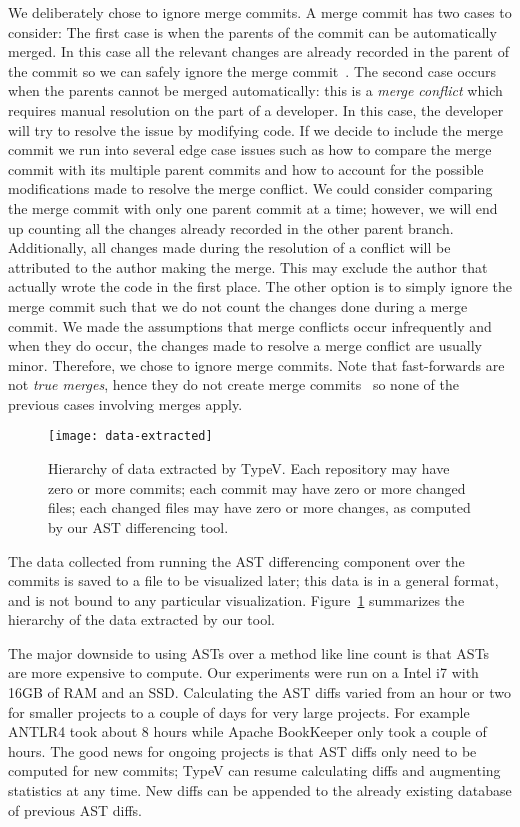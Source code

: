 We deliberately chose to ignore merge commits. A merge commit has two cases to consider: The first case is when the parents of the commit can be automatically merged. In this case all the relevant changes are already recorded in the parent of the commit so we can safely ignore the merge commit~\cite{git:merge}. The second case occurs when the parents cannot be merged automatically: this is a \emph{merge conflict} which requires manual resolution on the part of a developer. In this case, the developer will try to resolve the issue by modifying code. If we decide to include the merge commit we run into several edge case issues such as how to compare the merge commit with its multiple parent commits and how to account for the possible modifications made to resolve the merge conflict. We could consider comparing the merge commit with only one parent commit at a time; however, we will end up counting all the changes already recorded in the other parent branch. Additionally, all changes made during the resolution of a conflict will be attributed to the author making the merge. This may exclude the author that actually wrote the code in the first place. The other option is to simply ignore the merge commit such that we do not count the changes done during a merge commit. We made the assumptions that merge conflicts occur infrequently and when they do occur, the changes made to resolve a merge conflict are usually minor. Therefore, we chose to ignore merge commits. Note that fast-forwards are not \emph{true merges}, hence they do not create merge commits~\cite{git:merge} so none of the previous cases involving merges apply.

\begin{figure}[h]
\centering
\texttt{[image: data-extracted]}
\caption{Hierarchy of data extracted by TypeV. Each repository may have zero or more commits; each commit may have zero or more changed files; each changed files may have zero or more changes, as computed by our AST differencing tool.}
\label{fig:data-extracted}
\end{figure}

The data collected from running the AST differencing component over the commits is saved to a file to be visualized later; this data is in a general format, and is not bound to any particular visualization. Figure~\ref{fig:data-extracted} summarizes the hierarchy of the data extracted by our tool.

The major downside to using ASTs over a method like line count is that ASTs are more expensive to compute. Our experiments were run on a Intel i7 with 16GB of RAM and an SSD. Calculating the AST diffs varied from an hour or two for smaller projects to a couple of days for very large projects. For example ANTLR4 took about 8 hours while Apache BookKeeper only took a couple of hours. The good news for ongoing projects is that AST diffs only need to be computed for new commits; TypeV can resume calculating diffs and augmenting statistics at any time. New diffs can be appended to the already existing database of previous AST diffs.

